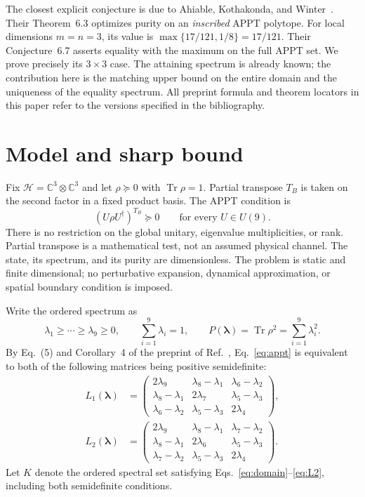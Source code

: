 \documentclass[aps,pra,onecolumn,notitlepage,10pt,amsmath,amssymb,longbibliography,nofootinbib]{revtex4-2}
\newcommand{\Tr}{\operatorname{Tr}}
\newcommand{\C}{\mathbb{C}}
\newcommand{\lam}{\boldsymbol{\lambda}}
\begin{document}
The closest explicit conjecture is due to Ahiable, Kothakonda, and
Winter~\cite{AhiableKothakondaWinter}. Their Theorem~6.3 optimizes purity on an
\emph{inscribed} APPT polytope. For local dimensions $m=n=3$, its value is
$\max\{17/121,1/8\}=17/121$. Their Conjecture~6.7 asserts equality with the
maximum on the full APPT set. We prove precisely its $3\times3$ case.
The attaining spectrum is already known; the contribution here is the matching
upper bound on the entire domain and the uniqueness of the equality spectrum.
All preprint formula and theorem locators in this paper refer to the versions
specified in the bibliography.

\section{Model and sharp bound}
\label{sec:model}

Fix $\mathcal H=\C^3\otimes\C^3$ and let $\rho\succeq0$ with $\Tr\rho=1$.
Partial transpose $T_B$ is taken on the second factor in a fixed product basis.
The APPT condition is
\begin{equation}
 (U\rho U^\dagger)^{T_B}\succeq0\qquad\text{for every }U\in U(9).
 \label{eq:appt}
\end{equation}
There is no restriction on the global unitary, eigenvalue multiplicities, or
rank. Partial transpose is a mathematical test, not an assumed physical channel.
The state, its spectrum, and its purity are dimensionless. The problem is static
and finite dimensional; no perturbative expansion, dynamical approximation, or
spatial boundary condition is imposed.

Write the ordered spectrum as
\begin{equation}
 \lambda_1\geq\cdots\geq\lambda_9\geq0,
 \qquad \sum_{i=1}^9\lambda_i=1,
 \qquad P(\lam)=\Tr\rho^2=\sum_{i=1}^9\lambda_i^2.
 \label{eq:domain}
\end{equation}
By Eq.~(5) and Corollary~4 of the preprint of Ref.~\cite{Hildebrand},
Eq.~\eqref{eq:appt} is equivalent to both of the following matrices being
positive semidefinite:
\begin{align}
 L_1(\lam)&=\begin{pmatrix}
 2\lambda_9&\lambda_8-\lambda_1&\lambda_6-\lambda_2\\
 \lambda_8-\lambda_1&2\lambda_7&\lambda_5-\lambda_3\\
 \lambda_6-\lambda_2&\lambda_5-\lambda_3&2\lambda_4
 \end{pmatrix},\label{eq:L1}\\
 L_2(\lam)&=\begin{pmatrix}
 2\lambda_9&\lambda_8-\lambda_1&\lambda_7-\lambda_2\\
 \lambda_8-\lambda_1&2\lambda_6&\lambda_5-\lambda_3\\
 \lambda_7-\lambda_2&\lambda_5-\lambda_3&2\lambda_4
 \end{pmatrix}.\label{eq:L2}
\end{align}
Let $K$ denote the ordered spectral set satisfying
Eqs.~\eqref{eq:domain}--\eqref{eq:L2}, including both semidefinite conditions.
\end{document}

